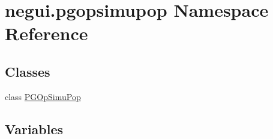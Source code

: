 \hypertarget{namespacenegui_1_1pgopsimupop}{}\section{negui.\+pgopsimupop Namespace Reference}
\label{namespacenegui_1_1pgopsimupop}
\subsection*{Classes}
\begin{DoxyCompactItemize}
\item 
class \hyperlink{classnegui_1_1pgopsimupop_1_1PGOpSimuPop}{P\+G\+Op\+Simu\+Pop}
\end{DoxyCompactItemize}
\subsection*{Variables}

